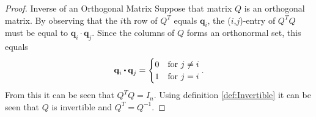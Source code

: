 \begin{proof}{Inverse of an Orthogonal Matrix}
    Suppose that matrix $Q$ is an orthogonal matrix.
    By observing that the $i$th row of $Q^T$ equals $\textbf{q}_i$, the ($i$,$j$)-entry of $Q^TQ$ must be equal to $\textbf{q}_i\cdot\textbf{q}_j$. Since the columns of $Q$ forms an orthonormal set, this equals 
    \begin{align*}
        \textbf{q}_i\vprik\textbf{q}_j=
    \begin{cases}
          0 & \text{for } j\neq i\\
          1 & \text{for } j= i
    \end{cases}.
    \end{align*}
    From this it can be seen that $Q^TQ=I_n$. Using definition \ref{def:Invertible} it can be seen that $Q$ is invertible and $Q^T=Q^{-1}$.
    \qedsymbol 
\end{proof}

